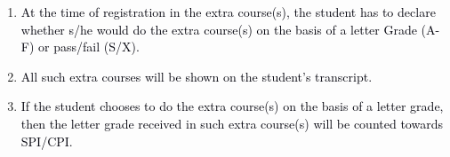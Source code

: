 \documentclass[12pt]{article}
\begin{document}
\vspace{\baselineskip}
\begin{enumerate}
	\item {\fontsize{10pt}{12.0pt}\selectfont \textcolor[HTML]{00000A}{At the time of registration in the extra course(s), the student has to declare whether s/he would do the extra course(s) on the basis of a letter Grade (A-F) or pass/fail (S/X).}\par}\par


\vspace{\baselineskip}
	\item {\fontsize{10pt}{12.0pt}\selectfont \textcolor[HTML]{00000A}{All such extra courses will be shown on the student's transcript.}\par}\par


\vspace{\baselineskip}
	\item {\fontsize{10pt}{12.0pt}\selectfont \textcolor[HTML]{00000A}{If the student chooses to do the extra course(s) on the basis of a letter grade, then the letter grade received in such extra course(s) will be counted towards SPI/CPI.}\par}
\end{enumerate}\par
\end{document}
